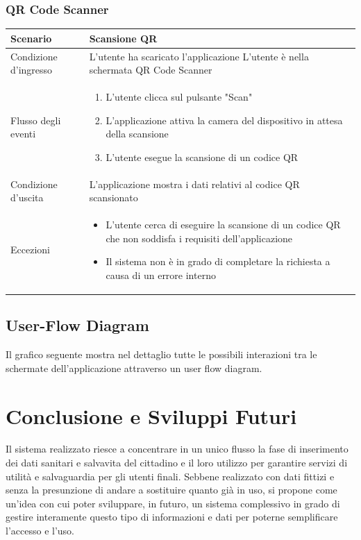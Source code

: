 \documentclass[12pt,a4paper,twoside,openright,titlepage]{book}
\begin{document}
\subsection{QR Code Scanner}
\begin{table}[H]
\centering
\begin{tabular}{|p{4cm}|p{10cm}|}
\hline
Scenario & Scansione QR \\
\hline
Condizione d'ingresso & L'utente ha scaricato l'applicazione\newline
L'utente è nella schermata QR Code Scanner\\
\hline
Flusso degli eventi & 
\begin{enumerate}
\item L'utente clicca sul pulsante "Scan"
\item L'applicazione attiva la camera del dispositivo in attesa della scansione
\item L'utente esegue la scansione di un codice QR
\end{enumerate}\\
\hline
Condizione d'uscita & L'applicazione mostra i dati relativi al codice QR scansionato\\
\hline
Eccezioni & 
\begin{itemize}
\item L'utente cerca di eseguire la scansione di un codice QR che non soddisfa i requisiti dell'applicazione
\item Il sistema non è in grado di completare la richiesta a causa di un errore interno
\end{itemize} \\
\hline
\end{tabular}
\end{table}

\section{User-Flow Diagram}
Il grafico seguente mostra nel dettaglio tutte le possibili interazioni tra le schermate dell'applicazione attraverso un user flow diagram.


\chapter{Conclusione e Sviluppi Futuri}
Il sistema realizzato riesce a concentrare in un unico flusso la fase di inserimento dei dati sanitari e salvavita del cittadino e il loro utilizzo per garantire servizi di utilità e salvaguardia per gli utenti finali. Sebbene realizzato con dati fittizi e senza la presunzione di andare a sostituire quanto già in uso, si propone come un'idea con cui poter sviluppare, in futuro, un sistema complessivo in grado di gestire interamente questo tipo di informazioni e dati per poterne semplificare l'accesso e l'uso.\newline
\end{document}
